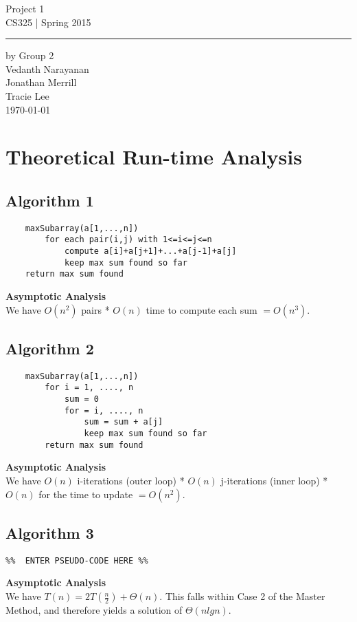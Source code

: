 \documentclass[11pt,letterpaper]{article}
\begin{document}
\begin{titlepage}
    \vspace*{4cm}
    \begin{flushright}
    {\huge
        Project 1\\[5mm]
    }
    {\large
        CS325 | Spring 2015
     }
    \end{flushright}
\hrule
    \begin{flushright}
	by Group 2\\
	Vedanth Narayanan\\
	Jonathan Merrill\\
	Tracie Lee\\
    \vfill
	\today\\
    \end{flushright}
\end{titlepage}

\raggedright

\section{Theoretical Run-time Analysis}

\subsection{Algorithm 1}
\begin{verbatim}
    maxSubarray(a[1,...,n])
        for each pair(i,j) with 1<=i<=j<=n
            compute a[i]+a[j+1]+...+a[j-1]+a[j]
            keep max sum found so far
    return max sum found
\end{verbatim}
\textbf{Asymptotic Analysis}\\
We have $O(n^2)$ pairs * $O(n)$ time to compute each sum $= O(n^3)$.

\subsection{Algorithm 2}
\begin{verbatim}
    maxSubarray(a[1,...,n])
        for i = 1, ...., n
            sum = 0
            for = i, ...., n
                sum = sum + a[j]
                keep max sum found so far
        return max sum found
\end{verbatim}
\textbf{Asymptotic Analysis}\\
We have $O(n)$ i-iterations (outer loop) * $O(n)$ j-iterations (inner loop) * $O(n)$ for the time to update $= O(n^2)$.

\subsection{Algorithm 3}
\begin{verbatim}
%%  ENTER PSEUDO-CODE HERE %%
\end{verbatim}
\textbf{Asymptotic Analysis}\\
We have $T(n) = 2T(\frac{n}{2}) + \Theta(n)$. This falls within Case 2 of the Master Method, and therefore yields a solution of $\Theta(nlgn)$.
\end{document}

